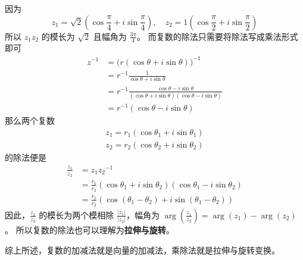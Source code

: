 \documentclass[../poma-notes.tex]{subfiles}
\begin{document}
\begin{anote}
\begin{center}
  \end{center}
  因为
  \[z_1=\sqrt{2}(\cos\frac{\pi}{4}+i\sin\frac{\pi}{4}),\quad z_2=1(\cos\frac{\pi}{2}+i\sin\frac{\pi}{2})\]
  所以 $z_1z_2$ 的模长为 $\sqrt{2}$ 且幅角为 $\frac{3\pi}{4}$。
  而复数的除法只需要将除法写成乘法形式即可
  \begin{align*}
    \mathcal{} z^{-1} & = \big(r(\cos\theta+i\sin\theta)\big)^{-1}                                             \\
                      & = r^{-1}\frac{1}{\cos\theta+i\sin\theta}                                               \\
                      & =r^{-1}\frac{\cos\theta-i\sin\theta}{(\cos\theta+i\sin\theta)(\cos\theta-i\sin\theta)} \\
                      & =r^{-1}(\cos\theta-i\sin\theta)
  \end{align*}
  那么两个复数
  \begin{align*}
    z_1 = r_1(\cos\theta_1 + i\sin\theta_1) \\
    z_2 = r_2(\cos\theta_2 + i\sin\theta_2)
  \end{align*}
  的除法便是
  \begin{align*}
    \mathcal{} \frac{z_1}{z_2} & = z_1{z_2}^{-1}                                                           \\
                               & = \frac{r_1}{r_2}(\cos\theta_1+i\sin\theta_2)(\cos\theta_1-i\sin\theta_2) \\
                               & = \frac{r_1}{r_2}(\cos(\theta_1-\theta_2)+i\sin(\theta_1-\theta_2))
  \end{align*}
  因此，$\frac{z_1}{z_2}$ 的模长为两个模相除 $\frac{|z_1|}{|z_2|}$，幅角为 $\arg(\frac{z_1}{z_2})=\arg(z_1)-\arg(z_2)$。
  所以复数的除法也可以理解为\textbf{拉伸与旋转}。

  综上所述，复数的加减法就是向量的加减法，乘除法就是拉伸与旋转变换。
\end{anote}
\end{document}

